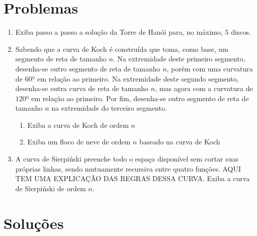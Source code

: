 \section*{Problemas}
\begin{enumerate}
\item
  Exiba passo a passo a solução da Torre de Hanói para, no máximo, 5 discos.
  \label{ex:cap04_ex1}

\item
  Sabendo que a curva de Koch é construída que toma, como base, um segmento de reta de tamanho $n$. Na extremidade deste primeiro segmento, desenha-se outro segmento de reta de tamanho $n$, porém com uma curvatura de $60º$ em relação ao primeiro. Na extremidade deste segundo segmento, desenha-se outra curva de reta de tamanho $n$, mas agora com a curvatura de $120º$ em relação ao primeiro. Por fim, desenha-se outro segmento de reta de tamanho $n$ na extremidade do terceiro segmento.
    \begin{enumerate}
      \item Exiba a curva de Koch de ordem $n$
        \label{ex:cap04_ex2a}
      \item Exiba um floco de neve de ordem $n$ baseado na curva de Koch
        \label{ex:cap04_ex2b}
    \end{enumerate}
  \label{ex:cap04_ex2}
\item
  A curva de Sierpiński preenche todo o espaço disponível sem cortar suas próprias linhas, sendo mutuamente recursiva entre quatro funções. AQUI TEM UMA EXPLICAÇÃO DAS REGRAS DESSA CURVA. Exiba a curva de Sierpiński de ordem $n$.
  \label{ex:cap04_ex3}
\end{enumerate}

\section*{Soluções}

